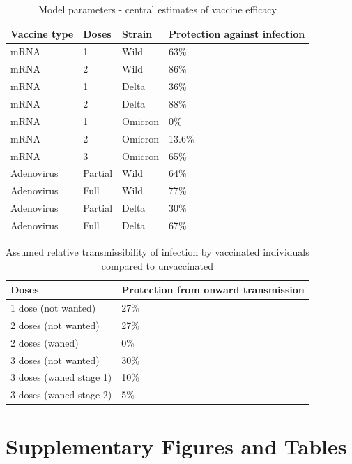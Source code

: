 \documentclass{article}
\begin{document}
\begin{table}

\caption{\label{tab:vaccine-efficacy}Model parameters - central estimates of vaccine efficacy}
\centering
\begin{tabular}[t]{llll}
\toprule
Vaccine type & Doses & Strain & Protection against infection\\
\midrule
mRNA & 1 & Wild & 63\%\\
mRNA & 2 & Wild & 86\%\\
mRNA & 1 & Delta & 36\%\\
mRNA & 2 & Delta & 88\%\\
mRNA & 1 & Omicron & 0\%\\
mRNA & 2 & Omicron & 13.6\%\\
mRNA & 3 & Omicron & 65\%\\
Adenovirus & Partial & Wild & 64\%\\
Adenovirus & Full & Wild & 77\%\\
Adenovirus & Partial & Delta & 30\%\\
Adenovirus & Full & Delta & 67\%\\
\bottomrule
\end{tabular}
\end{table}

\begin{table}

\caption{\label{tab:onward}Assumed relative transmissibility of infection by vaccinated individuals compared to unvaccinated}
\centering
\begin{tabular}[t]{ll}
\toprule
Doses & Protection from onward transmission\\
\midrule
1 dose (not wanted) & 27\%\\
2 doses (not wanted) & 27\%\\
2 doses (waned) & 0\%\\
3 doses (not wanted) & 30\%\\
3 doses (waned stage 1) & 10\%\\
3 doses (waned stage 2) & 5\%\\
\bottomrule
\end{tabular}
\end{table}

\section{Supplementary Figures and Tables}\label{supplementary-figures-and-tables}
\end{document}
